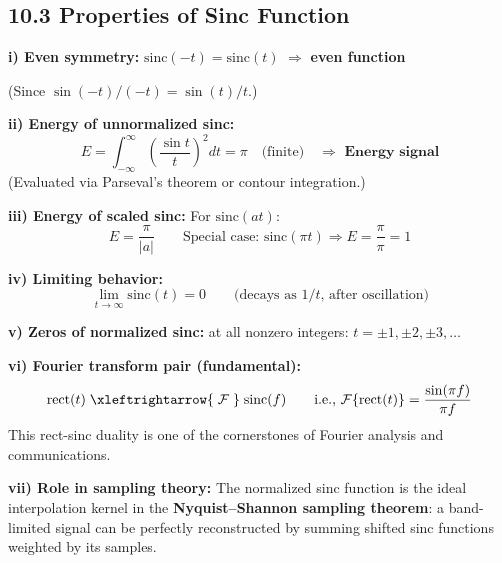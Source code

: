 \documentclass[10pt,a4paper]{article}
\begin{document}
\subsection*{10.3 Properties of Sinc Function}

\begin{propbox}
\textbf{i) Even symmetry:} $\mathrm{sinc}(-t) = \mathrm{sinc}(t)$ $\Rightarrow$ \textbf{even function}

(Since $\sin(-t)/(-t) = \sin(t)/t$.)

\textbf{ii) Energy of unnormalized sinc:}
\[
E = \int_{-\infty}^{\infty}\left(\frac{\sin t}{t}\right)^2 dt = \pi \quad \text{(finite)} \quad \Rightarrow \textbf{ Energy signal}
\]
(Evaluated via Parseval's theorem or contour integration.)

\textbf{iii) Energy of scaled sinc:} For $\mathrm{sinc}(at)$:
\[
E = \frac{\pi}{|a|} \qquad \text{Special case: sinc}(\pi t) \Rightarrow E = \frac{\pi}{\pi} = 1
\]

\textbf{iv) Limiting behavior:}
\[
\lim_{t\to\infty}\mathrm{sinc}(t) = 0 \qquad \text{(decays as } 1/t \text{, after oscillation)}
\]

\textbf{v) Zeros of normalized sinc:} at all nonzero integers: $t = \pm1, \pm2, \pm3, \ldots$

\textbf{vi) Fourier transform pair (fundamental):}
\[
\mathrm{rect}(t) \;\xleftrightarrow{\;\mathcal{F}\;}\; \mathrm{sinc}(f) \qquad \text{i.e., } \mathcal{F}\{\mathrm{rect}(t)\} = \frac{\sin(\pi f)}{\pi f}
\]
This rect-sinc duality is one of the cornerstones of Fourier analysis and communications.

\textbf{vii) Role in sampling theory:} The normalized sinc function is the ideal interpolation kernel in the \textbf{Nyquist--Shannon sampling theorem}: a band-limited signal can be perfectly reconstructed by summing shifted sinc functions weighted by its samples.
\end{propbox}

\begin{center}
\end{center}
\end{document}
